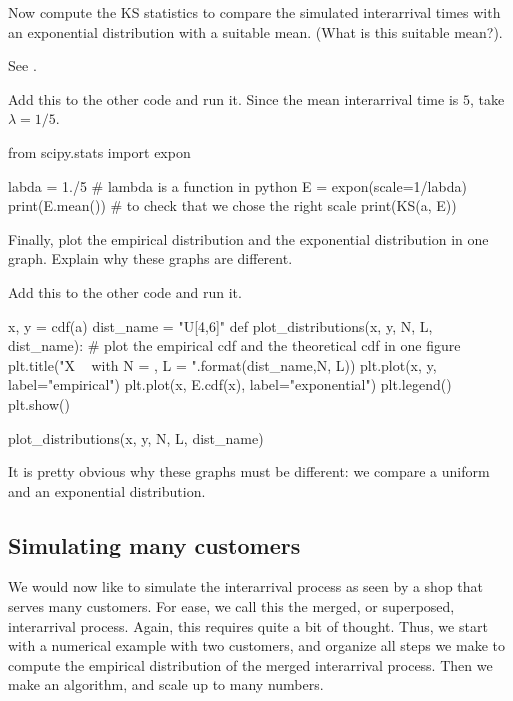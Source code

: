 \documentclass{scrartcl}
\begin{document}
\begin{exercise}
  Now compute the KS statistics to compare the simulated interarrival times with an exponential distribution with a suitable mean. (What is this suitable mean?).

See .


\begin{solution}
Add this to the other code and run it. Since the mean interarrival time is $5$, take $\lambda = 1/5$.

\begin{pyverbatim}
from scipy.stats import expon

labda = 1./5 # lambda is a function in python
E = expon(scale=1/labda) 
print(E.mean()) # to check that we chose the right scale
print(KS(a, E))    
\end{pyverbatim}
\end{solution}
\end{exercise}

\begin{exercise}
  Finally, plot the empirical distribution and the exponential distribution in one graph. Explain why these graphs are different.
\begin{solution}
Add this to the other code and run it. 
\begin{pyverbatim}
x, y = cdf(a)
dist_name = "U[4,6]"
def plot_distributions(x, y, N, L, dist_name):
    # plot the empirical cdf and the theoretical cdf in one figure
    plt.title("X ~ {} with N = {}, L = {}".format(dist_name,N, L))
    plt.plot(x, y, label="empirical")
    plt.plot(x, E.cdf(x), label="exponential")
    plt.legend()
    plt.show()

plot_distributions(x, y, N, L, dist_name)	
\end{pyverbatim}

It is pretty obvious why these graphs must be different: we compare a uniform and an exponential distribution. 
\end{solution}
\end{exercise}


\subsection{Simulating many customers}
\label{sec:simul-many-cust}

We would now like to simulate the interarrival process as seen by a shop that serves many customers. For ease, we call this the merged, or superposed, interarrival process. Again, this requires quite a bit of thought. Thus, we start with a numerical example with two customers, and organize all steps we make to compute the empirical distribution of the merged interarrival process. Then we make an algorithm, and scale up to many numbers. 
\end{document}
